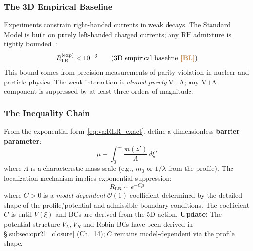\subsubsection{The 3D Empirical Baseline}

Experiments constrain right-handed currents in weak decays. The Standard Model
is built on purely left-handed charged currents; any RH admixture is tightly
bounded~\cite{PDG2024}:
\begin{equation}
    R_{\text{LR}}^{\text{(exp)}} < 10^{-3}
    \qquad \text{(3D empirical baseline \textcolor{brown}{\textbf{[BL]}}{})}
    \label{eq:va:empirical_bound}
\end{equation}
This bound comes from precision measurements of parity violation in nuclear
and particle physics. The weak interaction is \emph{almost purely} V$-$A;
any V$+$A component is suppressed by at least three orders of magnitude.

\subsubsection{The Inequality Chain}

From the exponential form~\eqref{eq:va:RLR_exact}, define a dimensionless
\textbf{barrier parameter}:
\begin{equation}
    \mu \equiv \int_0^{z_*} \frac{m(z')}{\Lambda}\,d\xi'
    \label{eq:va:mu_def}
\end{equation}
where $\Lambda$ is a characteristic mass scale (e.g., $m_0$ or $1/\lambda$ from
the profile). The localization mechanism implies exponential suppression:
\begin{equation}
    R_{\text{LR}} \sim e^{-C\mu}
    \label{eq:va:RLR_mu}
\end{equation}
where $C > 0$ is a \emph{model-dependent} $\mathcal{O}(1)$ coefficient determined
by the detailed shape of the profile/potential and admissible boundary conditions.
The coefficient $C$ is \tagOPEN{} until $V(\xi)$ and BCs are derived from the 5D action.
\textbf{Update:} The potential structure $V_L, V_R$ and Robin BCs have been derived in
\S\ref{subsec:opr21_closure} (Ch.~14); $C$ remains model-dependent via the profile shape.

